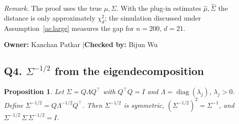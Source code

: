 \documentclass[11pt]{article}
\newtheorem{proposition}[theorem]{Proposition}
\theoremstyle{definition}
\newcommand{\T}{^{\top}}
\newcommand{\diag}{\operatorname{diag}}
\newcommand{\owner}[2]{\par\medskip\noindent\textbf{Owner:} #1 \quad$|$\quad \textbf{Checked by:} #2\par\medskip}
\begin{document}
\noindent\textit{Remark.} The proof uses the true $\mu,\Sigma$. With the plug-in estimates $\hat\mu,\hat\Sigma$ the distance is only approximately $\chi^2_d$; the simulation discussed under Assumption~\ref{as:large} measures the gap for $n=200$, $d=21$.
\owner{Kanchan Patkar}{Bijun Wu}

\subsection*{Q4. $\Sigma^{-1/2}$ from the eigendecomposition}
\begin{proposition}\label{prop:invsqrt}
Let $\Sigma=Q\Lambda Q\T$ with $Q\T Q=I$ and $\Lambda=\diag(\lambda_j)$, $\lambda_j>0$. Define $\Sigma^{-1/2}=Q\Lambda^{-1/2}Q\T$. Then $\Sigma^{-1/2}$ is symmetric, $(\Sigma^{-1/2})^2=\Sigma^{-1}$, and $\Sigma^{-1/2}\,\Sigma\,\Sigma^{-1/2}=I$.
\end{proposition}
\end{document}

